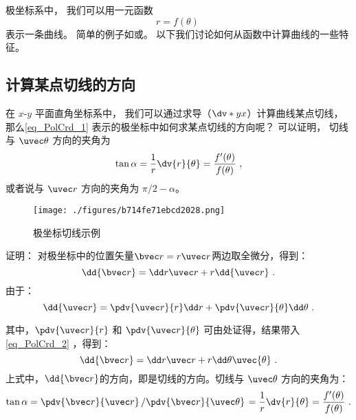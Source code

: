 
\begin{issues}
\issueDraft
\end{issues}


极坐标系中， 我们可以用一元函数
\begin{equation}\label{eq_PolCrd_1}
r = f(\theta)~
\end{equation}
表示一条曲线。 简单的例子如或。 以下我们讨论如何从函数中计算曲线的一些特征。

\subsection{计算某点切线的方向}


在 $x$-$y$ 平面直角坐标系中， 我们可以通过求导（$\dv*{y}{x}$）计算曲线某点切线， 那么\autoref{eq_PolCrd_1} 表示的极坐标中如何求某点切线的方向呢？ 可以证明， 切线与 $\uvec\theta$ 方向的夹角为
\begin{equation}
\tan\alpha = \frac{1}{r} \dv{r}{\theta} = \frac{f'(\theta)}{f(\theta)}~,
\end{equation}
或者说与 $\uvec r$ 方向的夹角为 $\pi/2 - \alpha$。

\begin{figure}[ht]
\centering
\texttt{[image: ./figures/b714fe71ebcd2028.png]}
\caption{极坐标切线示例} \label{fig_PolCrd_1}
\end{figure}

证明：
对极坐标中的位置矢量$\bvec r = r \uvec r$两边取全微分，得到：
\begin{equation}
\dd{\bvec r} = \dd r \uvec r + r\dd{\uvec r}~.
\end{equation}
由于：
\begin{equation}\label{eq_PolCrd_2}
\dd{\uvec r} = \pdv {\uvec r}{r} \dd r + \pdv {\uvec r}{\theta} \dd\theta~.
\end{equation}

其中，$\pdv {\uvec r}{r}$ 和 $\pdv {\uvec r}{\theta}$ 可由处证得，结果带入\autoref{eq_PolCrd_2} ，得到：
\begin{equation}\label{eq_PolCrd_6}
\dd{\bvec r} = \dd r \uvec r+ r \dd \theta\uvec{\theta}~.
\end{equation}
上式中，$\dd{\bvec r}$的方向，即是切线的方向。切线与 $\uvec\theta$ 方向的夹角为：
\begin{equation}
\tan \alpha = \pdv{\bvec r}{\uvec r}\left/ \pdv{\bvec r}{\uvec\theta}\right.
=\frac{1}{r} \dv{r}{\theta} = \frac{f'(\theta)}{f(\theta)}~.
\end{equation}


